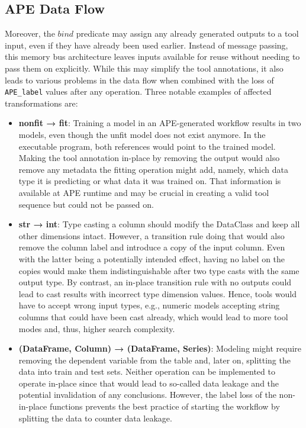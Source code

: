 \subsection{APE Data Flow}
Moreover, the \(bind\) predicate may assign any already generated outputs to a tool input, even if they have already been used earlier. Instead of message passing, this memory bus architecture leaves inputs available for reuse without needing to pass them on explicitly. While this may simplify the tool annotations, it also leads to various problems in the data flow when combined with the loss of \verb|APE_label| values after any operation. Three notable examples of affected transformations are:
\begin{itemize}
    \item \textbf{nonfit → fit}: Training a model in an APE-generated workflow results in two models, even though the unfit model does not exist anymore. In the executable program, both references would point to the trained model. Making the tool annotation in-place by removing the output would also remove any metadata the fitting operation might add, namely, which data type it is predicting or what data it was trained on. That information is available at APE runtime and may be crucial in creating a valid tool sequence but could not be passed on.
    \item \textbf{str → int}: Type casting a column should modify the DataClass and keep all other dimensions intact. However, a transition rule doing that would also remove the column label and introduce a copy of the input column. Even with the latter being a potentially intended effect, having no label on the copies would make them indistinguishable after two type casts with the same output type. By contrast, an in-place transition rule with no outputs could lead to cast results with incorrect type dimension values. Hence, tools would have to accept wrong input types, e.g., numeric models accepting string columns that could have been cast already, which would lead to more tool modes and, thus, higher search complexity.
    \item \textbf{(DataFrame, Column) → (DataFrame, Series)}: Modeling might require removing the dependent variable from the table and, later on, splitting the data into train and test sets. Neither operation can be implemented to operate in-place since that would lead to so-called data leakage and the potential invalidation of any conclusions. However, the label loss of the non-in-place functions prevents the best practice of starting the workflow by splitting the data to counter data leakage.
\end{itemize}

